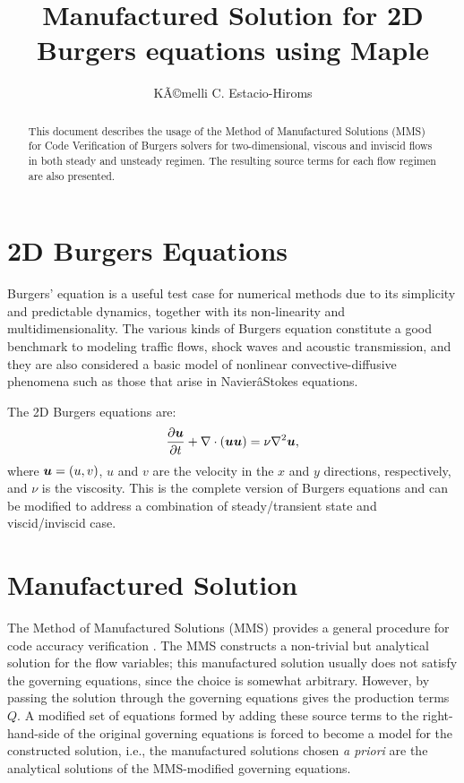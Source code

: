 \documentclass[10pt]{article}
\title{Manufactured Solution for 2D Burgers equations using Maple}
\author{KÃ©melli C. Estacio-Hiroms}
\newcommand{\diff}[2] {\dfrac{\partial #1}{\partial #2}}
\newcommand{\bv}[1]{\ensuremath{\mbox{\boldmath$ #1 $}}}
\begin{document}
\maketitle
\tableofcontents


\begin{abstract}
This document describes the usage of the Method of Manufactured Solutions (MMS) for Code Verification of Burgers solvers for two-dimensional, viscous and inviscid flows in both steady and unsteady regimen. The resulting source terms for each flow regimen are also presented.
\end{abstract}


\section{2D Burgers Equations}

Burgers' equation is a useful test case for numerical methods due to its simplicity and predictable dynamics, together with its non-linearity and multidimensionality. The various kinds of Burgers equation constitute a good benchmark to modeling traffic flows, shock waves and acoustic transmission, and they are also considered a basic model of nonlinear convective-diffusive phenomena such as those that arise
in NavierâStokes equations.


The 2D Burgers  equations are:
\begin{equation}
 \label{eq:burgers2d_01}
\begin{split}
&\diff{\bv{u} }{t} + \nabla\cdot(\bv{uu}) = \nu \nabla^2 \bv{u},\\
\end{split}
\end{equation}
%
where $\bv{u}=(u,v)$,  $u$ and $v$ are the velocity in the  $x$ and $y$  directions, respectively, and $\nu$ is the viscosity. This is the complete version of Burgers equations and can be modified to address a combination of steady/transient state and viscid/inviscid case.

\section{Manufactured Solution}
The Method of Manufactured Solutions (MMS) provides a general procedure for  code accuracy verification \citep{Roache2002,Bond2007}.
The MMS constructs a non-trivial but analytical solution for the flow variables; this manufactured
solution usually does not  satisfy the governing equations, since the choice is somewhat arbitrary. However, by passing the solution through the governing equations gives the production terms $Q$. A modified set of equations formed by adding these source terms to the right-hand-side of the original governing equations is forced to become a model for the constructed solution, i.e., the manufactured solutions chosen \textit{a priori} are the analytical solutions of the MMS-modified governing equations.
\end{document}
